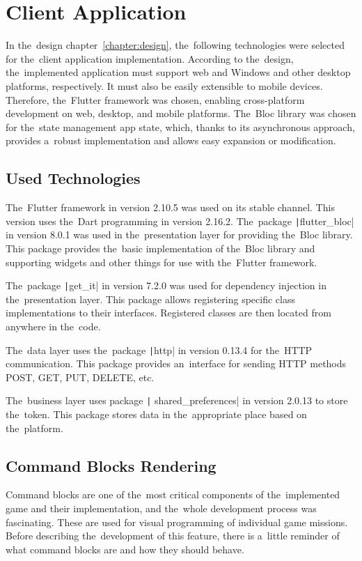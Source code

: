 \section{Client Application}

In the~design chapter~\ref{chapter:design}, the~following technologies were selected for the~client application implementation.
According to the~design, the~implemented application must support web and Windows and other desktop platforms, respectively.
It must also be easily extensible to mobile devices.
Therefore, the~Flutter framework was chosen, enabling cross-platform development on web, desktop, and mobile platforms.
The~Bloc library was chosen for the~state management app state, which, thanks to its asynchronous approach, provides a~robust implementation and allows easy expansion or modification.

\subsection{Used Technologies}

The~Flutter framework in version 2.10.5 was used on its stable channel.
This version uses the~Dart programming in version 2.16.2.
The~package \texttt|flutter_bloc| in version 8.0.1 was used in the~presentation layer for providing the~Bloc library.
This package provides the~basic implementation of the~Bloc library and supporting widgets and other things for use with the~Flutter framework.

The~package \texttt|get_it| in version 7.2.0 was used for dependency injection in the~presentation layer.
This package allows registering specific class implementations to their interfaces.
Registered classes are then located from anywhere in the~code.

The~data layer uses the~package \texttt|http| in version 0.13.4 for the~HTTP communication.
This package provides an~interface for sending HTTP methods POST, GET, PUT, DELETE, etc.

The~business layer uses package \texttt| shared_preferences| in version 2.0.13 to store the~token.
This package stores data in the~appropriate place based on the~platform.

\subsection{Command Blocks Rendering}

Command blocks are one of the~most critical components of the~implemented game and their implementation, and the~whole development process was fascinating.
These are used for visual programming of individual game missions.
Before describing the~development of this feature, there is a~little reminder of what command blocks are and how they should behave.

